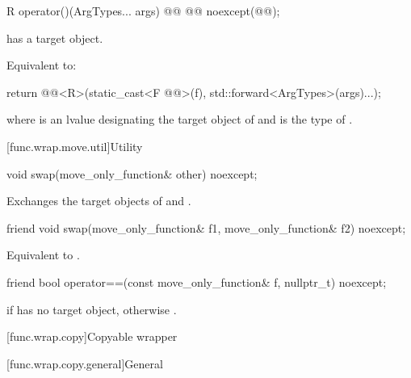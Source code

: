 %
\begin{itemdecl}
R operator()(ArgTypes... args) @\cv{}@ @@ noexcept(@@);
\end{itemdecl}

\begin{itemdescr}
\pnum
\expects
{} has a target object.

\pnum
\effects
Equivalent to:
\begin{codeblock}
return @@<R>(static_cast<F @@>(f), std::forward<ArgTypes>(args)...);
\end{codeblock}
where  is an lvalue designating the target object of  and
 is the type of .
\end{itemdescr}

[func.wrap.move.util]{Utility}

%
\begin{itemdecl}
void swap(move_only_function& other) noexcept;
\end{itemdecl}

\begin{itemdescr}
\pnum
\effects
Exchanges the target objects of  and .
\end{itemdescr}

%
\begin{itemdecl}
friend void swap(move_only_function& f1, move_only_function& f2) noexcept;
\end{itemdecl}

\begin{itemdescr}
\pnum
\effects
Equivalent to .
\end{itemdescr}

%
\begin{itemdecl}
friend bool operator==(const move_only_function& f, nullptr_t) noexcept;
\end{itemdecl}

\begin{itemdescr}
\pnum
\returns
{} if  has no target object, otherwise .
\end{itemdescr}

[func.wrap.copy]{Copyable wrapper}

[func.wrap.copy.general]{General}

